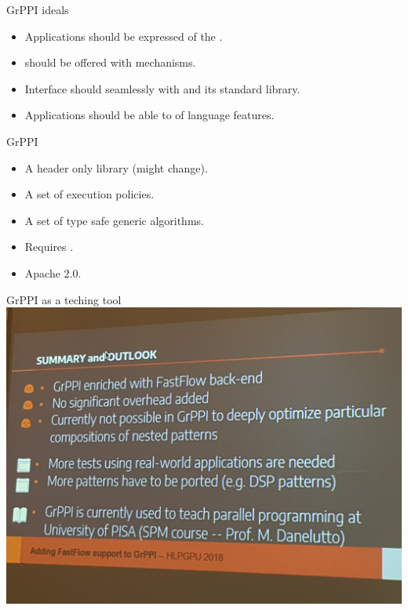 \begin{frame}[t]{GrPPI ideals}
\begin{itemize}[<+->]
  \item Applications should be expressed  of the
        .
  \vfill
  \item {} should be offered with 
        mechanisms.
  \vfill
  \item Interface should  seamlessly with  and
        its standard library.
  \vfill
  \item Applications should be able to  of  language features.
\end{itemize}
\end{frame}

\begin{frame}[t]{GrPPI}
\begin{Large}
\end{Large}
\vfill\pause
\begin{itemize}
  \item A header only library (might change).
  \item A set of execution policies.
  \item A set of type safe generic algorithms.
  \item Requires .
  \item Apache 2.0.
\end{itemize}
\end{frame}

\begin{frame}[t]{GrPPI as a teching tool}
\includegraphics[width=\textwidth]{img/grppi-upi.jpg}
\end{frame}

